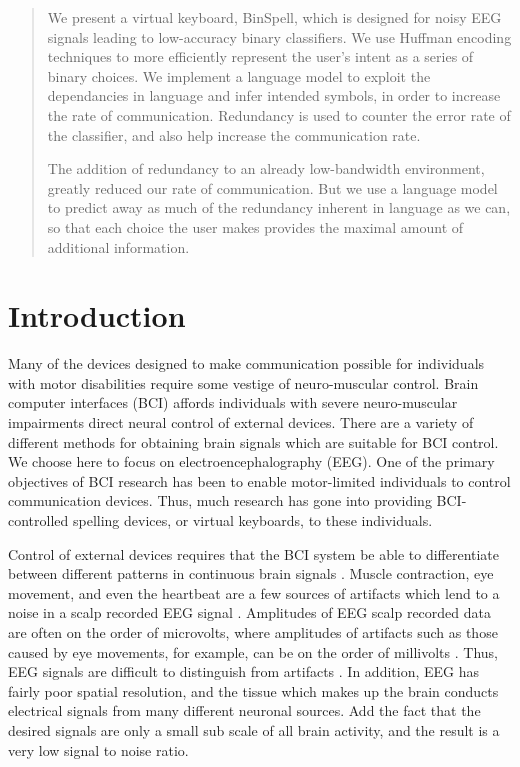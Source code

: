 \documentclass[12pt,titlepage]{article}
\begin{document}
\begin{abstract}
We present a virtual keyboard, BinSpell, which is designed for noisy EEG signals leading to low-accuracy binary classifiers.  We use Huffman encoding techniques to more efficiently represent the user's intent as a series of binary choices.  We implement a language model to exploit the dependancies in language and infer intended symbols, in order to increase the rate of communication. Redundancy is used to counter the error rate of the classifier, and also help increase the communication rate.

The addition of redundancy to an already low-bandwidth environment, greatly reduced our rate 
of communication. But we use a language model to predict away as much of the redundancy 
inherent in language as we can, so that each choice the user makes provides the maximal 
amount of additional information.
\end{abstract}


\section{Introduction}

Many of the devices designed to make communication possible for individuals with motor 
disabilities require some vestige of neuro-muscular control.  Brain computer interfaces (BCI) 
affords individuals with severe neuro-muscular impairments direct neural control of external 
devices.  There are a variety of different methods for obtaining brain signals which are suitable 
for BCI control.  We choose here to focus on electroencephalography (EEG).  One of the 
primary objectives of BCI research has been to enable motor-limited individuals to control 
communication devices.  Thus, much research has gone into providing BCI-controlled spelling 
devices, or virtual keyboards, to these individuals.

Control of external devices requires that the BCI system be able to differentiate between 
different patterns in continuous brain signals \cite{lotte_review_2007}.  Muscle contraction, eye movement, and even the heartbeat are a few sources of artifacts which lend to a noise in a scalp recorded EEG signal \cite{nunez_electric_2005}.  Amplitudes of EEG scalp recorded data are often on the order of microvolts, where amplitudes of artifacts such as those caused by eye movements, for example, can be on the order of millivolts \cite{tatum2007handbook}.  Thus, EEG signals are difficult to distinguish from artifacts \cite{nunez_electric_2005}.  In addition, EEG has fairly poor spatial resolution, and the tissue which makes up the brain conducts electrical signals from many different neuronal sources.  Add the fact that the desired signals are only a small sub scale of all brain activity, and the result is a very low signal to noise ratio.
\end{document}
